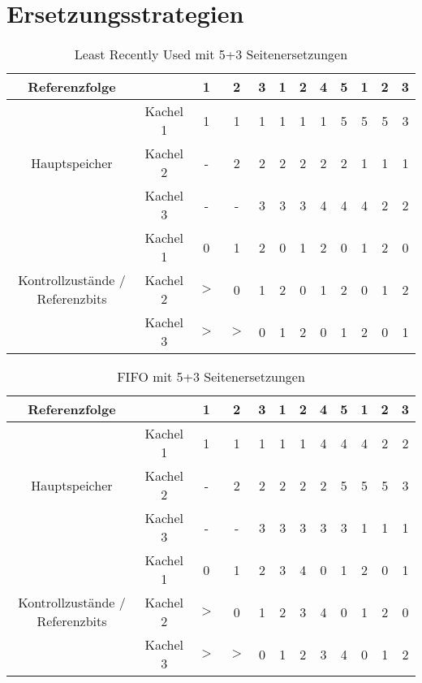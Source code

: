 \documentclass[a4paper]{article}
\begin{document}
\section{Ersetzungsstrategien}
\begin{table}[h]
    \centering
    \begin{tabular}{c c|c|c|c|c|c|c|c|c|c|c}
        \toprule
         Referenzfolge & & 1 & 2 & 3 & 1 & 2 & 4 & 5 & 1 & 2 & 3  \\
         \midrule
         \multirow{3}{*}{Hauptspeicher} & 
         Kachel 1 & 1 & 1 & 1 & 1 & 1 & 1 & 5 & 5 & 5 & 3 \\ 
          & Kachel 2 & - & 2 & 2 & 2 & 2 & 2 & 2 & 1 & 1 & 1 \\ 
           & Kachel 3 &- & - & 3 & 3 & 3 & 4 & 4 & 4 & 2 & 2\\ 
           \midrule
           \multirow{3}{*}{Kontrollzustände / Referenzbits} & 
           Kachel 1 & 0 & 1 & 2 & 0 & 1 & 2 & 0 & 1 & 2 & 0\\ 
          & Kachel 2 & $>$& 0 & 1 & 2 & 0 & 1 & 2 & 0 & 1 & 2 \\ 
           & Kachel 3 & $>$& $>$ & 0 & 1 & 2 & 0 & 1 & 2 & 0 & 1\\ 
           \bottomrule
    \end{tabular}
    \caption{Least Recently Used mit 5+3 Seitenersetzungen}
    \label{tab:my_label}
\end{table}


\begin{table}[h]
    \centering
    \begin{tabular}{c c|c|c|c|c|c|c|c|c|c|c}
        \toprule
         Referenzfolge & & 1 & 2 & 3 & 1 & 2 & 4 & 5 & 1 & 2 & 3  \\
         \midrule
         \multirow{3}{*}{Hauptspeicher} & 
         Kachel 1 & 1 & 1 & 1 & 1 & 1 & 4 & 4 & 4  & 2 & 2 \\ 
          & Kachel 2 & - & 2 & 2 & 2 & 2 & 2 & 5 & 5 & 5 & 3  \\ 
           & Kachel 3 & - & - & 3 & 3 & 3 & 3 & 3 & 1 & 1 & 1\\ 
           \midrule
           \multirow{3}{*}{Kontrollzustände / Referenzbits} & 
           Kachel 1 & 0 & 1 & 2 & 3 & 4 & 0 & 1 & 2 & 0 & 1\\ 
          & Kachel 2 &$>$ & 0 & 1 & 2 & 3 & 4  & 0 & 1 & 2 & 0 \\ 
           & Kachel 3 & $>$ & $>$ & 0 & 1 & 2 & 3  & 4 & 0 & 1 & 2 \\ 
          
           \bottomrule
    \end{tabular}
    \caption{FIFO mit 5+3 Seitenersetzungen}
    \label{tab:my_label}
\end{table}
\end{document}
